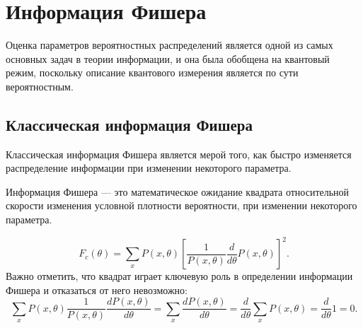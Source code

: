 \section{Информация Фишера}

Оценка параметров вероятностных распределений является одной из самых основных задач в теории информации,
и она была обобщена на квантовый режим\cite{Helstrom1976, Holevo1982}, поскольку описание квантового измерения является по сути вероятностным.

\subsection{Классическая информация Фишера}
Классическая информация Фишера является мерой того,
как быстро изменяется распределение информации при изменении некоторого параметра.

\begin{definition}\label{def:fisher-information}
 Информация Фишера --- это математическое ожидание квадрата относительной скорости изменения условной плотности вероятности,
 при изменении некоторого параметра.
\end{definition}
%
\begin{equation}\label{eq:fisher-information}
  F_c({\theta})=
      \sum_x{{P}(x,\theta)}
          \left[\frac{1}{P(x,\theta)}
     \frac{d}{d\theta}
  {P(x,\theta)}\right]^2.
\end{equation}
%
Важно отметить,
что квадрат играет ключевую роль в определении информации Фишера
и отказаться от него невозможно:
%
\begin{equation}
    \label{eq:2}
        \sum_x{{P}(x,\theta)}
            \frac{1}{P(x,\theta)}
                \frac{dP(x,\theta)}{d\theta} =
                    \sum_x\frac{{dP}(x,\theta)}{d\theta} =
                \frac{d}{d\theta}\sum_x{{P}(x,\theta)} =
            \frac{d}{d\theta}1 =
            0.
\end{equation}

